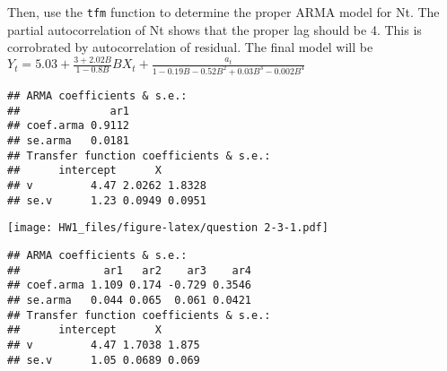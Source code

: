 \documentclass[]{article}
\newenvironment{Shaded}{\begin{snugshade}}{\end{snugshade}}
\newcommand{\KeywordTok}[1]{\textcolor[rgb]{0.13,0.29,0.53}{\textbf{#1}}}
\newcommand{\DataTypeTok}[1]{\textcolor[rgb]{0.13,0.29,0.53}{#1}}
\newcommand{\DecValTok}[1]{\textcolor[rgb]{0.00,0.00,0.81}{#1}}
\newcommand{\StringTok}[1]{\textcolor[rgb]{0.31,0.60,0.02}{#1}}
\newcommand{\OperatorTok}[1]{\textcolor[rgb]{0.81,0.36,0.00}{\textbf{#1}}}
\newcommand{\NormalTok}[1]{#1}
\begin{document}
Then, use the \texttt{tfm} function to determine the proper ARMA model
for Nt. The partial autocorrelation of Nt shows that the proper lag
should be 4. This is corrobrated by autocorrelation of residual. The
final model will be
\(Y_{t} = 5.03 + \frac{3+2.02B}{1-0.8B}BX_{t} + \frac{a_{t}}{1-0.19B-0.52B^2+0.03B^3-0.002B^4}\)

\begin{Shaded}
\end{Shaded}

\begin{verbatim}
## ARMA coefficients & s.e.: 
##              ar1
## coef.arma 0.9112
## se.arma   0.0181
## Transfer function coefficients & s.e.: 
##      intercept      X       
## v         4.47 2.0262 1.8328
## se.v      1.23 0.0949 0.0951
\end{verbatim}

\begin{Shaded}
\end{Shaded}

\texttt{[image: HW1\_files/figure-latex/question 2-3-1.pdf]}

\begin{Shaded}
\end{Shaded}

\begin{verbatim}
## ARMA coefficients & s.e.: 
##             ar1   ar2    ar3    ar4
## coef.arma 1.109 0.174 -0.729 0.3546
## se.arma   0.044 0.065  0.061 0.0421
## Transfer function coefficients & s.e.: 
##      intercept      X      
## v         4.47 1.7038 1.875
## se.v      1.05 0.0689 0.069
\end{verbatim}
\end{document}
